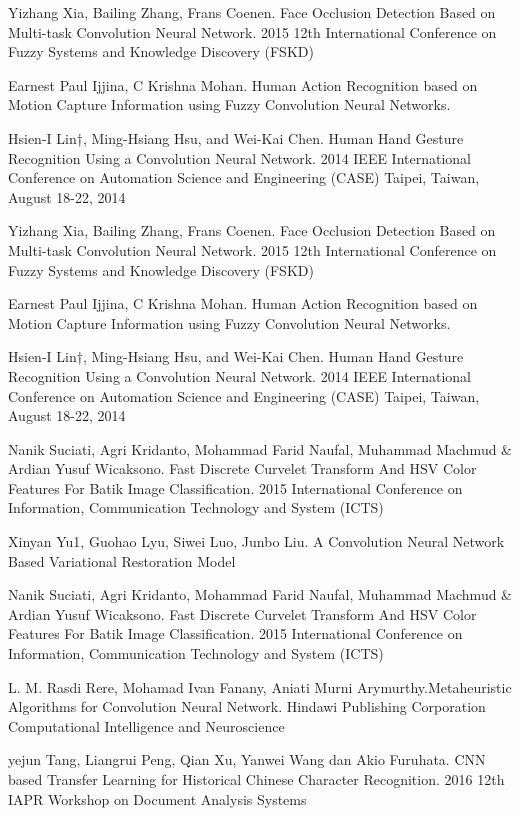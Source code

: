 %
% 

% 
% 
\begin{thebibliography}{4}

\bibitem Yizhang Xia, Bailing Zhang, Frans Coenen. Face Occlusion Detection Based on Multi-task Convolution Neural Network. 2015 12th International Conference on Fuzzy Systems and Knowledge Discovery (FSKD)

\bibitem Earnest Paul Ijjina, C Krishna Mohan. Human Action Recognition based on Motion Capture Information using Fuzzy Convolution Neural Networks. 

\bibitem Hsien-I Lin†, Ming-Hsiang Hsu, and Wei-Kai Chen. Human Hand Gesture Recognition Using a Convolution Neural Network. 2014 IEEE International Conference on Automation Science and Engineering (CASE) Taipei, Taiwan, August 18-22, 2014

\bibitem Yizhang Xia, Bailing Zhang, Frans Coenen. Face Occlusion Detection Based on Multi-task Convolution Neural Network. 2015 12th International Conference on Fuzzy Systems and Knowledge Discovery (FSKD)

\bibitem Earnest Paul Ijjina, C Krishna Mohan. Human Action Recognition based on Motion Capture Information using Fuzzy Convolution Neural Networks. 

\bibitem Hsien-I Lin†, Ming-Hsiang Hsu, and Wei-Kai Chen. Human Hand Gesture Recognition Using a Convolution Neural Network. 2014 IEEE International Conference on Automation Science and Engineering (CASE) Taipei, Taiwan, August 18-22, 2014

\bibitem Nanik Suciati, Agri Kridanto, Mohammad Farid Naufal, Muhammad Machmud \& Ardian Yusuf Wicaksono. Fast Discrete Curvelet Transform And HSV Color Features For Batik Image Classification. 2015 International Conference on Information, Communication Technology and System (ICTS)

\bibitem Xinyan Yu1, Guohao Lyu, Siwei Luo, Junbo Liu. A Convolution Neural Network Based Variational Restoration Model

\bibitem Nanik Suciati, Agri Kridanto, Mohammad Farid Naufal, Muhammad Machmud \& Ardian Yusuf Wicaksono. Fast Discrete Curvelet Transform And HSV Color Features For Batik Image Classification. 2015 International Conference on Information, Communication Technology and System (ICTS)

\bibitem L. M. Rasdi Rere, Mohamad Ivan Fanany, Aniati Murni Arymurthy.Metaheuristic Algorithms for Convolution Neural Network. Hindawi Publishing Corporation Computational Intelligence and Neuroscience

\bibitem yejun Tang, Liangrui Peng, Qian Xu, Yanwei Wang dan Akio Furuhata. CNN based Transfer Learning for Historical Chinese Character Recognition. 2016 12th IAPR Workshop on Document Analysis Systems

\end{thebibliography}

